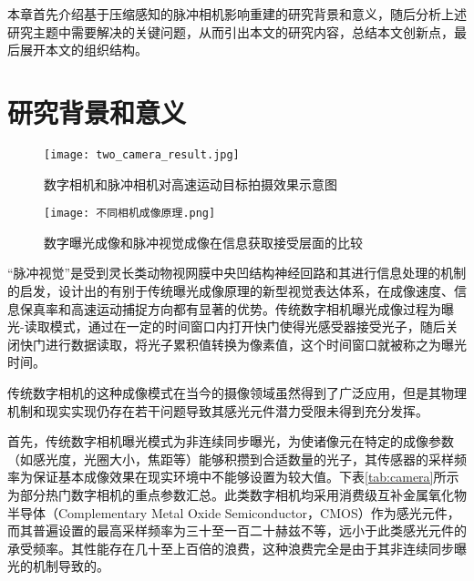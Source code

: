 本章首先介绍基于压缩感知的脉冲相机影响重建的研究背景和意义，随后分析上述研究主题中需要解决的关键问题，从而引出本文的研究内容，总结本文创新点，最后展开本文的组织结构。

\section{研究背景和意义}

\begin{figure}[ht]
  \centering
  \texttt{[image: two\_camera\_result.jpg]}
  \caption{数字相机和脉冲相机对高速运动目标拍摄效果示意图}
  \label{fig:two_camera_result}
\end{figure}
\begin{figure}[ht]
  \centering
  \texttt{[image: 不同相机成像原理.png]}
  \caption{数字曝光成像和脉冲视觉成像在信息获取接受层面的比较}
  \label{fig:two_camera_result_tenet}
\end{figure}




“脉冲视觉”是受到灵长类动物视网膜中央凹结构神经回路和其进行信息处理的机制的启发，设计出的有别于传统曝光成像原理的新型视觉表达体系，在成像速度、信息保真率和高速运动捕捉方向都有显著的优势。传统数字相机曝光成像过程为曝光-读取模式，通过在一定的时间窗口内打开快门使得光感受器接受光子，随后关闭快门进行数据读取，将光子累积值转换为像素值，这个时间窗口就被称之为曝光时间。

传统数字相机的这种成像模式在当今的摄像领域虽然得到了广泛应用，但是其物理机制和现实实现仍存在若干问题导致其感光元件潜力受限未得到充分发挥。

首先，传统数字相机曝光模式为非连续同步曝光，为使诸像元在特定的成像参数（如感光度，光圈大小，焦距等）能够积攒到合适数量的光子，其传感器的采样频率为保证基本成像效果在现实环境中不能够设置为较大值。下表\ref{tab:camera}所示为部分热门数字相机的重点参数汇总。此类数字相机均采用消费级互补金属氧化物半导体（Complementary Metal Oxide Semiconductor，CMOS）作为感光元件，而其普遍设置的最高采样频率为三十至一百二十赫兹不等，远小于此类感光元件的承受频率\cite{Huang_Tiejun110}。其性能存在几十至上百倍的浪费，这种浪费完全是由于其非连续同步曝光的机制导致的。

